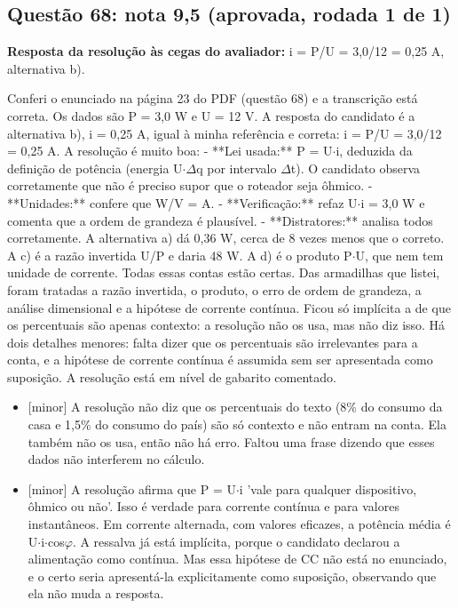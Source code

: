 \documentclass{article}%
\begin{document}
\subsection*{Questão 68: nota 9,5 (aprovada, rodada 1 de 1)}%
\textbf{Resposta da resolução às cegas do avaliador:} i = P/U = 3,0/12 = 0,25 A, alternativa b).\par %
Conferi o enunciado na página 23 do PDF (questão 68) e a transcrição está correta. Os dados são P = 3,0 W e U = 12 V.\newline%
\newline%
A resposta do candidato é a alternativa b), i = 0,25 A, igual à minha referência e correta: i = P/U = 3,0/12 = 0,25 A.\newline%
\newline%
A resolução é muito boa:\newline%
{-} **Lei usada:** P = U$\cdot$i, deduzida da definição de potência (energia U$\cdot$$\Delta$q por intervalo $\Delta$t). O candidato observa corretamente que não é preciso supor que o roteador seja ôhmico.\newline%
{-} **Unidades:** confere que W/V = A.\newline%
{-} **Verificação:** refaz U$\cdot$i = 3,0 W e comenta que a ordem de grandeza é plausível.\newline%
{-} **Distratores:** analisa todos corretamente. A alternativa a) dá 0,36 W, cerca de 8 vezes menos que o correto. A c) é a razão invertida U/P e daria 48 W. A d) é o produto P$\cdot$U, que nem tem unidade de corrente. Todas essas contas estão certas.\newline%
\newline%
Das armadilhas que listei, foram tratadas a razão invertida, o produto, o erro de ordem de grandeza, a análise dimensional e a hipótese de corrente contínua. Ficou só implícita a de que os percentuais são apenas contexto: a resolução não os usa, mas não diz isso.\newline%
\newline%
Há dois detalhes menores: falta dizer que os percentuais são irrelevantes para a conta, e a hipótese de corrente contínua é assumida sem ser apresentada como suposição. A resolução está em nível de gabarito comentado.%
\begin{itemize}%
\item%
{[}minor{]} A resolução não diz que os percentuais do texto (8\% do consumo da casa e 1,5\% do consumo do país) são só contexto e não entram na conta. Ela também não os usa, então não há erro. Faltou uma frase dizendo que esses dados não interferem no cálculo.%
\item%
{[}minor{]} A resolução afirma que P = U$\cdot$i 'vale para qualquer dispositivo, ôhmico ou não'. Isso é verdade para corrente contínua e para valores instantâneos. Em corrente alternada, com valores eficazes, a potência média é U$\cdot$i$\cdot$cos$\varphi$. A ressalva já está implícita, porque o candidato declarou a alimentação como contínua. Mas essa hipótese de CC não está no enunciado, e o certo seria apresentá{-}la explicitamente como suposição, observando que ela não muda a resposta.%
\end{itemize}%
\end{document}
